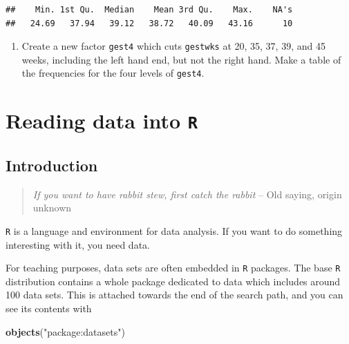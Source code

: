\documentclass[
]{book}
\newenvironment{Shaded}{\begin{snugshade}}{\end{snugshade}}
\newcommand{\FunctionTok}[1]{\textcolor[rgb]{0.13,0.29,0.53}{\textbf{#1}}}
\newcommand{\NormalTok}[1]{#1}
\newcommand{\StringTok}[1]{\textcolor[rgb]{0.31,0.60,0.02}{#1}}
\providecommand{\tightlist}{%
  \setlength{\itemsep}{0pt}\setlength{\parskip}{0pt}}
\begin{document}
\begin{verbatim}
##    Min. 1st Qu.  Median    Mean 3rd Qu.    Max.    NA's 
##   24.69   37.94   39.12   38.72   40.09   43.16      10
\end{verbatim}

\begin{enumerate}
\def\labelenumi{\arabic{enumi}.}
\setcounter{enumi}{1}
\tightlist
\item
  Create a new factor \texttt{gest4} which cuts \texttt{gestwks} at 20,
  35, 37, 39, and 45 weeks, including the left hand end, but not the
  right hand. Make a table of the frequencies for the four levels of \texttt{gest4}.
\end{enumerate}

\chapter{\texorpdfstring{Reading data into \texttt{R}}{Reading data into R}}\label{reading-data-into-r}

\section{Introduction}\label{introduction}

\begin{quote}
\emph{If you want to have rabbit stew, first catch the rabbit} -- Old saying, origin unknown
\end{quote}

\texttt{R} is a language and environment for data analysis. If you
want to do something interesting with it, you need data.

For teaching purposes, data sets are often embedded in \texttt{R}
packages. The base \texttt{R} distribution contains a whole package
dedicated to data which includes around 100 data sets. This is
attached towards the end of the search path, and you can see its
contents with

\begin{Shaded}
\begin{Highlighting}[]
\FunctionTok{objects}\NormalTok{(}\StringTok{"package:datasets"}\NormalTok{)}
\end{Highlighting}
\end{Shaded}
\end{document}
